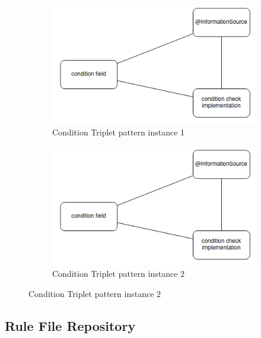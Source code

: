 \begin{figure}
    \centering
    \begin{subfigure}[b]{0.45\linewidth}
        \centering
        \includegraphics[width=\linewidth]{./figures/condition-triplet-pattern}
        \caption{Condition Triplet pattern instance 1}
        \label{fig:condition-triplet-pattern-instance-1}
    \end{subfigure}
    \hspace{5mm} %
    \begin{subfigure}[b]{0.45\linewidth}
        \centering
        \includegraphics[width=\linewidth]{./figures/condition-triplet-pattern}
        \caption{Condition Triplet pattern instance 2}
        \label{fig:condition-triplet-pattern-instance-2}
    \end{subfigure}
    \label{fig:coffee}
\end{figure}



\subsection{Rule File Repository}


